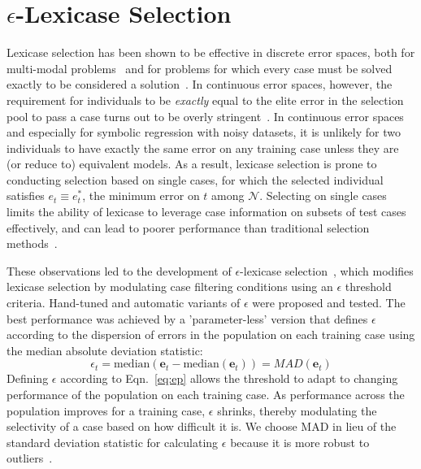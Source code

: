 \documentclass[twoside]{article}
\begin{document}
\section{{\large $\epsilon$}-Lexicase Selection}\label{s:eplex}

Lexicase selection has been shown to be effective in discrete error spaces, both for multi-modal problems~\citep{spector_assessment_2012} and for problems for which every case must be solved exactly to be considered a solution~\citep{helmuth_solving_2014, helmuth_general_2015-1}. In continuous error spaces, however, the requirement for individuals to be {\it exactly} equal to the elite error in the selection pool to pass a case turns out to be overly stringent~\citep{la_cava_epsilon-lexicase_2016}. In continuous error spaces and especially for symbolic regression with noisy datasets, it is unlikely for two individuals to have exactly the same error on any training case unless they are (or reduce to) equivalent models. As a result, lexicase selection is prone to conducting selection based on single cases, for which the selected individual satisfies $e_t \equiv e^*_t$, the minimum error on $t$ among $\mathcal{N}$. Selecting on single cases limits the ability of lexicase to leverage case information on subsets of test cases effectively, and can lead to poorer performance than traditional selection methods~\citep{la_cava_epsilon-lexicase_2016}. 

These observations led to the development of $\epsilon$-lexicase selection~\citep{la_cava_epsilon-lexicase_2016}, which modifies lexicase selection by modulating case filtering conditions using an $\epsilon$ threshold criteria. Hand-tuned and automatic variants of $\epsilon$ were proposed and tested. The best performance was achieved by a 'parameter-less' version that defines $\epsilon$ according to the dispersion of errors in the population on each training case using the median absolute deviation statistic:  
\begin{equation}\label{eq:ep}
\epsilon_t = \text{median}(\mathbf{e}_t - \text{median}(\mathbf{e}_t)) = MAD(\mathbf{e}_t)
\end{equation}
Defining $\epsilon$ according to Eqn.~\ref{eq:ep} allows the threshold to adapt to changing performance of the population on each training case. As performance across the population improves for a training case, $\epsilon$ shrinks, thereby modulating the selectivity of a case based on how difficult it is. We choose MAD in lieu of the standard deviation statistic for calculating $\epsilon$ because it is more robust to outliers~\citep{pham-gia_mean_2001}. 
\end{document}
